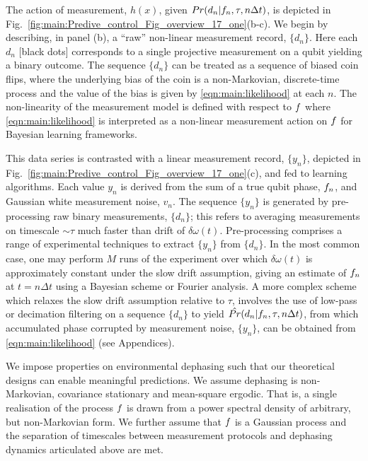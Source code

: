 The action of measurement, $h(x)$, given $Pr(d_n | f_n, \tau, n \Delta t)$, is depicted in Fig.~\ref{fig:main:Predive_control_Fig_overview_17_one}(b-c).  We begin by describing, in panel (b), a ``raw'' non-linear measurement record, $\{ d_n\}$.  Here each $d_n$ [black dots] corresponds to a single projective measurement on a qubit yielding a binary outcome. The sequence $\{ d_n\}$ can be treated as a sequence of biased coin flips, where the underlying bias of the coin is a non-Markovian, discrete-time process and the value of the bias is given by \cref{eqn:main:likelihood} at each $n$. The non-linearity of the measurement model is defined with respect to $f$ where \cref{eqn:main:likelihood} is interpreted as a non-linear measurement action on $f$ for Bayesian learning frameworks.

This data series is contrasted with a linear measurement record, $\{ y_n\}$, depicted in Fig.~\ref{fig:main:Predive_control_Fig_overview_17_one}(c), and fed to learning algorithms.  Each value $y_n$ is derived from the sum of a true qubit phase, $f_n$, and Gaussian white measurement noise, $v_n$.  The sequence $\{ y_n\}$ is generated by pre-processing raw binary measurements, $\{ d_n\}$; this refers to averaging measurements on timescale $\sim\tau$ much faster than drift of $\delta \omega (t)$. Pre-processing comprises a range of experimental techniques to extract $\{ y_n\}$ from $\{ d_n\}$. In the most common case, one may perform $M$ runs of the experiment over which $\delta \omega (t)$ is approximately constant under the slow drift assumption, giving an estimate of  $f_n$ at $t = n \Delta t $ using a Bayesian scheme or Fourier analysis. A more complex scheme which relaxes the slow drift assumption relative to $\tau$, involves the use of low-pass or decimation filtering on a sequence $\{ d_n\}$  to yield $\hat{Pr}(d_n | f_n, \tau, n\Delta t)$, from which accumulated phase corrupted by measurement noise, $\{ y_n\}$, can be obtained from \cref{eqn:main:likelihood} (see Appendices). 

We impose properties on environmental dephasing such that our theoretical designs can enable meaningful predictions. We assume dephasing is non-Markovian, covariance stationary and mean-square ergodic.  That is, a single realisation of the process $f$ is drawn from a power spectral density of arbitrary, but non-Markovian form. We further assume that $f$ is a Gaussian process and the separation of timescales between measurement protocols and dephasing dynamics articulated above are met.

